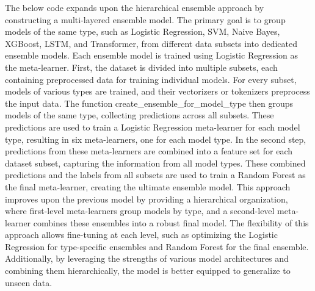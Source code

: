\noindent
The below code expands upon the hierarchical ensemble approach by constructing a multi-layered ensemble model. The primary goal is to group models of the same type, such as Logistic Regression, SVM, Naive Bayes, XGBoost, LSTM, and Transformer, from different data subsets into dedicated ensemble models. Each ensemble model is trained using Logistic Regression as the meta-learner. First, the dataset is divided into multiple subsets, each containing preprocessed data for training individual models. For every subset, models of various types are trained, and their vectorizers or tokenizers preprocess the input data. The function create\_ensemble\_for\_model\_type then groups models of the same type, collecting predictions across all subsets. These predictions are used to train a Logistic Regression meta-learner for each model type, resulting in six meta-learners, one for each model type. In the second step, predictions from these meta-learners are combined into a feature set for each dataset subset, capturing the information from all model types. These combined predictions and the labels from all subsets are used to train a Random Forest as the final meta-learner, creating the ultimate ensemble model. This approach improves upon the previous model by providing a hierarchical organization, where first-level meta-learners group models by type, and a second-level meta-learner combines these ensembles into a robust final model. The flexibility of this approach allows fine-tuning at each level, such as optimizing the Logistic Regression for type-specific ensembles and Random Forest for the final ensemble. Additionally, by leveraging the strengths of various model architectures and combining them hierarchically, the model is better equipped to generalize to unseen data.

